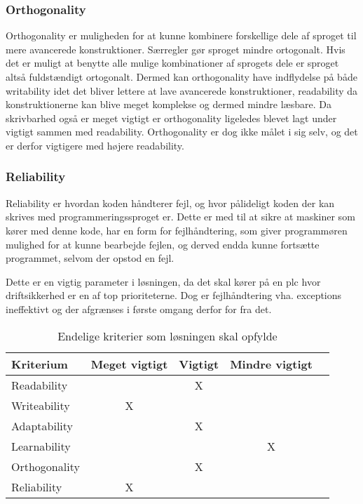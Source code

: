 \subsubsection*{Orthogonality} Orthogonality er muligheden for at kunne kombinere forskellige dele af sproget til mere avancerede konstruktioner. Særregler gør sproget mindre ortogonalt. Hvis det er muligt at benytte alle mulige kombinationer af sprogets dele er sproget altså fuldstændigt ortogonalt. Dermed kan orthogonality have indflydelse på både writability idet det bliver lettere at lave avancerede konstruktioner, readability da konstruktionerne kan blive meget komplekse og dermed mindre læsbare. Da skrivbarhed også er meget vigtigt er orthogonality ligeledes blevet lagt under vigtigt sammen med readability. Orthogonality er dog ikke målet i sig selv, og det er derfor vigtigere med højere readability.\\

\subsubsection*{Reliability} Reliability er hvordan koden håndterer fejl, og hvor pålideligt koden der kan skrives med programmeringssproget er. Dette er med til at sikre at maskiner som kører med denne kode, har en form for fejlhåndtering, som giver programmøren mulighed for at kunne bearbejde fejlen, og derved endda kunne fortsætte programmet, selvom der opstod en fejl.

Dette er en vigtig parameter i løsningen, da det skal kører på en \gls{plc} hvor driftsikkerhed er en af top prioriteterne. Dog er fejlhåndtering vha. exceptions ineffektivt og der afgrænses i første omgang derfor for fra det.\\


\begin{table}[H]
\centering
{}
\begin{tabular}{l c c c c}
\toprule
\textbf{Kriterium} & \textbf{Meget vigtigt} & \textbf{Vigtigt} & \textbf{Mindre vigtigt}  \\ \midrule
Readability        &   & X &       \\ 
Writeability       & X &   &       \\ 
Adaptability       &   & X &       \\ 
Learnability       &   &   & X     \\ 
Orthogonality      &   & X &       \\ 
Reliability        & X &   &       \\ \bottomrule
\end{tabular}
\caption{Endelige kriterier som løsningen skal opfylde}
\label{table:kriterier}
\end{table}



